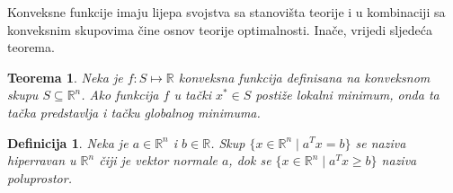 \documentclass[a4paper, utf8, 11pt, colorlinks]{book}
\newtheorem{definition}{Definicija}[chapter]
\newtheorem{thm}{Teorema}[chapter]
\theoremstyle{definition}
\begin{document}
Konveksne funkcije imaju lijepa svojstva sa stanovišta teorije i u kombinaciji sa konveksnim skupovima čine osnov  teorije optimalnosti. Inače, vrijedi sljedeća teorema.
\begin{thm}\label{thm:globalopt}
  Neka je $f : S \mapsto \mathbb{R}$ konveksna funkcija definisana na konveksnom skupu $S \subseteq \mathbb{R}^n$. Ako funkcija $f$ u tački $x^* \in S$
 postiže lokalni minimum, onda ta tačka predstavlja i tačku globalnog minimuma.
\end{thm}

\begin{definition}
   Neka je $a\in \mathbb{R}^n $ i $b \in \mathbb{R}$. Skup $\{ x \in \mathbb{R}^n \mid a^T x = b \}$ se naziva hiperravan u $\mathbb{R}^n$ čiji je vektor normale $a$, dok se $\{ x \in \mathbb{R}^n \mid a^T x \geq b \}$ naziva poluprostor.  
\end{definition}
\end{document}
